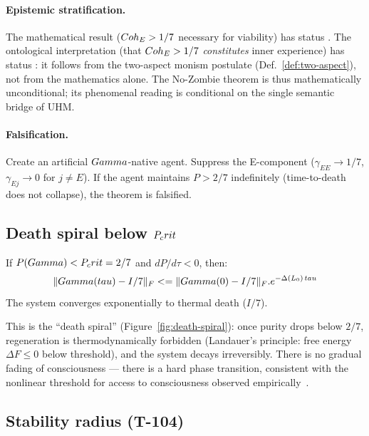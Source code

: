 \paragraph{Epistemic stratification.}
The mathematical result ($Coh_E > 1/7$ necessary for viability) has status .
The ontological interpretation (that $Coh_E > 1/7$ \emph{constitutes} inner experience)
has status : it follows from the two-aspect monism postulate
(Def.~\ref{def:two-aspect}), not from the mathematics alone. The No-Zombie theorem
is thus mathematically unconditional; its phenomenal reading is conditional on the
single semantic bridge of UHM.

\paragraph{Falsification.}
Create an artificial $Gamma$-native agent. Suppress the E-component ($\gamma_{EE} \to 1/7$,
$\gamma_{Ej} \to 0$ for $j \neq E$). If the agent maintains $P > 2/7$ indefinitely
(time-to-death does not collapse), the theorem is falsified.

\subsection{Death spiral below $P_crit$}
\label{subsec:death-spiral}

\begin{theorembox}
If $P(Gamma) < P_crit = 2/7$ and $dP/d\tau < 0$, then:
\begin{equation}
  \|Gamma(tau) - I/7\|_F <= \|Gamma(0) - I/7\|_F . e^{-\Delta(L_0)\,tau}
  \label{eq:death-spiral}
\end{equation}
The system converges exponentially to thermal death ($I/7$).
\end{theorembox}

This is the ``death spiral'' (Figure~\ref{fig:death-spiral}): once purity
drops below $2/7$, regeneration is thermodynamically forbidden (Landauer's
principle: free energy $\Delta F \leq 0$ below threshold), and the system
decays irreversibly. There is no gradual fading of consciousness --- there
is a hard phase transition, consistent with the nonlinear threshold for
access to consciousness observed empirically~\cite{delcul2007}.

\subsection{Stability radius (T-104)}
\label{subsec:stability-radius}

